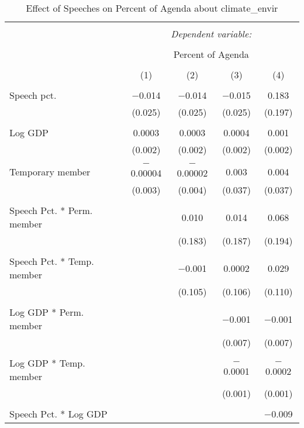
\begin{table}[!htbp] \centering 
  \caption{Effect of Speeches on Percent of Agenda about  climate_envir} 
  \label{} 
\begin{tabular}{@{\extracolsep{5pt}}lcccc} 
\\[-1.8ex]\hline 
\hline \\[-1.8ex] 
 & \multicolumn{4}{c}{\textit{Dependent variable:}} \\ 
\cline{2-5} 
\\[-1.8ex] & \multicolumn{4}{c}{Percent of Agenda} \\ 
\\[-1.8ex] & (1) & (2) & (3) & (4)\\ 
\hline \\[-1.8ex] 
 Speech pct. & $-$0.014 & $-$0.014 & $-$0.015 & 0.183 \\ 
  & (0.025) & (0.025) & (0.025) & (0.197) \\ 
  & & & & \\ 
 Log GDP & 0.0003 & 0.0003 & 0.0004 & 0.001 \\ 
  & (0.002) & (0.002) & (0.002) & (0.002) \\ 
  & & & & \\ 
 Temporary member & $-$0.00004 & $-$0.00002 & 0.003 & 0.004 \\ 
  & (0.003) & (0.004) & (0.037) & (0.037) \\ 
  & & & & \\ 
 Speech Pct. * Perm. member &  & 0.010 & 0.014 & 0.068 \\ 
  &  & (0.183) & (0.187) & (0.194) \\ 
  & & & & \\ 
 Speech Pct. * Temp. member &  & $-$0.001 & 0.0002 & 0.029 \\ 
  &  & (0.105) & (0.106) & (0.110) \\ 
  & & & & \\ 
 Log GDP * Perm. member &  &  & $-$0.001 & $-$0.001 \\ 
  &  &  & (0.007) & (0.007) \\ 
  & & & & \\ 
 Log GDP * Temp. member &  &  & $-$0.0001 & $-$0.0002 \\ 
  &  &  & (0.001) & (0.001) \\ 
  & & & & \\ 
 Speech Pct. * Log GDP &  &  &  & $-$0.009 \\ 

\end{tabular}
\end{table}
